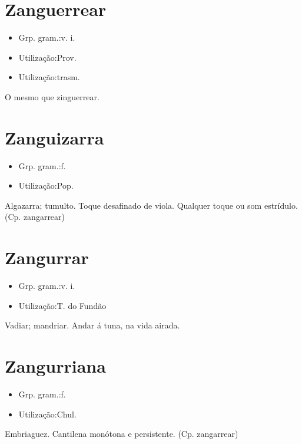 \section{Zanguerrear}
\begin{itemize}
\item {Grp. gram.:v. i.}
\end{itemize}
\begin{itemize}
\item {Utilização:Prov.}
\end{itemize}
\begin{itemize}
\item {Utilização:trasm.}
\end{itemize}
O mesmo que \textunderscore zinguerrear\textunderscore .
\section{Zanguizarra}
\begin{itemize}
\item {Grp. gram.:f.}
\end{itemize}
\begin{itemize}
\item {Utilização:Pop.}
\end{itemize}
Algazarra; tumulto.
Toque desafinado de viola.
Qualquer toque ou som estrídulo.
(Cp. \textunderscore zangarrear\textunderscore )
\section{Zangurrar}
\begin{itemize}
\item {Grp. gram.:v. i.}
\end{itemize}
\begin{itemize}
\item {Utilização:T. do Fundão}
\end{itemize}
Vadiar; mandriar.
Andar á tuna, na vida airada.
\section{Zangurriana}
\begin{itemize}
\item {Grp. gram.:f.}
\end{itemize}
\begin{itemize}
\item {Utilização:Chul.}
\end{itemize}
Embriaguez.
Cantilena monótona e persistente.
(Cp. \textunderscore zangarrear\textunderscore )
